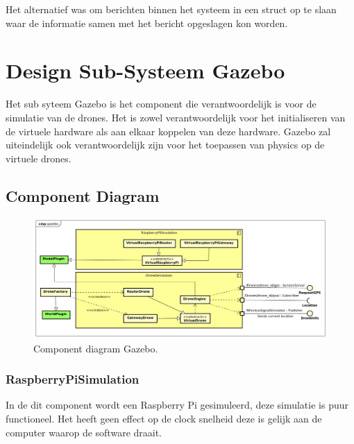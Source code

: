\documentclass[a4paper, 11pt, oneside]{report}
\begin{document}
Het alternatief was om berichten binnen het systeem in een struct op te slaan waar de informatie samen met het bericht opgeslagen kon worden.


\section{Design Sub-Systeem Gazebo}
\label{DetailedDesign:MeshNetwerk}
Het sub syteem Gazebo is het component die verantwoordelijk is voor de simulatie van de drones. 
Het is zowel verantwoordelijk voor het initialiseren van de virtuele hardware als aan elkaar koppelen van deze hardware.
Gazebo zal uiteindelijk ook verantwoordelijk zijn voor het toepassen van physics op de virtuele drones. 


\subsection{Component Diagram}
\label{DetailedDesign:MeshNetwerk:ComponentDiagram}
\begin{figure}[H]
	\begin{center}\includegraphics[width=\linewidth]{Afbeeldingen/gazeboComponentDiagram.png}\end{center}
	\caption{Component diagram Gazebo.}
	\label{fig:component:Gazebo}
\end{figure}

\subsubsection{RaspberryPiSimulation}
\label{architectural:subcomponenten:RaspberryPiSimulation}
In de dit component wordt een Raspberry Pi gesimuleerd, deze simulatie is puur functioneel.
Het heeft geen effect op de clock snelheid deze is gelijk aan de computer waarop de software draait. 
\end{document}
